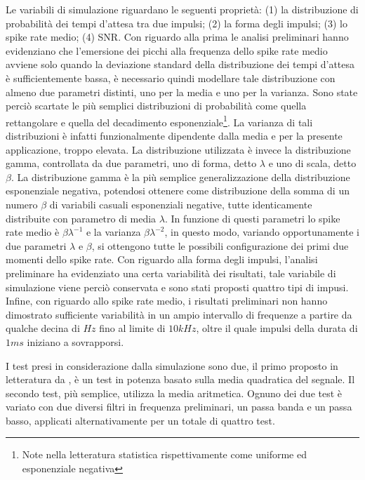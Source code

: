 \documentclass[9pt,twocolumn,twoside]{osajnl}
\begin{document}
Le variabili di simulazione riguardano le seguenti proprietà: (1) la distribuzione di probabilità dei tempi d'attesa tra due impulsi; (2) la forma degli impulsi; (3) lo spike rate medio; (4) SNR. Con riguardo alla prima le analisi preliminari hanno evidenziano che l'emersione dei picchi alla frequenza dello spike rate medio avviene solo quando la deviazione standard della distribuzione dei tempi d'attesa è sufficientemente bassa, è necessario quindi modellare tale distribuzione con almeno due parametri distinti, uno per la media e uno per la varianza. Sono state perciò scartate le più semplici distribuzioni di probabilità come quella rettangolare e quella del decadimento esponenziale\footnote{Note nella letteratura statistica rispettivamente come uniforme ed esponenziale negativa}. La varianza di tali distribuzioni è infatti funzionalmente dipendente dalla media e per la presente applicazione, troppo elevata. La distribuzione utilizzata è invece la distribuzione gamma, controllata da due parametri, uno di forma, detto $\lambda$ e uno di scala, detto $\beta$. La distribuzione gamma è la più semplice generalizzazione della distribuzione esponenziale negativa, potendosi ottenere come distribuzione della somma di un numero $\beta$ di variabili casuali esponenziali negative, tutte identicamente distribuite con parametro di media $\lambda$. In funzione di questi parametri lo spike rate medio è $\beta\lambda^{-1}$ e la varianza $\beta\lambda^{-2}$, in questo modo, variando opportunamente i due parametri $\lambda$ e $\beta$, si ottengono tutte le possibili configurazione dei primi due momenti dello spike rate. Con riguardo alla forma degli impulsi, l'analisi preliminare ha evidenziato una certa variabilità dei risultati, tale variabile di simulazione viene perciò conservata e sono stati proposti quattro tipi di impusi. Infine, con riguardo allo spike rate medio, i risultati preliminari non hanno dimostrato sufficiente variabilità in un ampio intervallo di frequenze a partire da qualche decina di $Hz$ fino al limite di $10kHz$, oltre il quale impulsi della durata di $1ms$ iniziano a sovrapporsi.

I test presi in considerazione dalla simulazione sono due, il primo proposto in letteratura da \cite{Lambacher2011}, è un test in potenza basato sulla media quadratica del segnale. Il secondo test, più semplice, utilizza la media aritmetica. Ognuno dei due test è variato con due diversi filtri in frequenza preliminari, un passa banda e un passa basso, applicati alternativamente per un totale di quattro test. 
\end{document}
